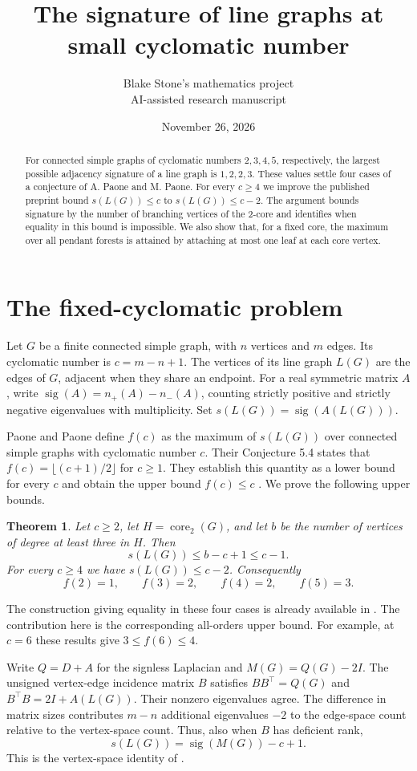 \documentclass[11pt]{article}
\title{The signature of line graphs at small cyclomatic number}
\author{Blake Stone's mathematics project\\\small AI-assisted research manuscript}
\date{November 26, 2026}
\newtheorem{theorem}{Theorem}[section]
\newcommand{\sg}{\operatorname{sig}}
\newcommand{\core}{\operatorname{core}_2}
\begin{document}
\maketitle
\begin{abstract}
For connected simple graphs of cyclomatic numbers $2,3,4,5$, respectively, the largest possible adjacency signature of a line graph is $1,2,2,3$. These values settle four cases of a conjecture of A. Paone and M. Paone. For every $c\ge4$ we improve the published preprint bound $s(L(G))\le c$ to $s(L(G))\le c-2$. The argument bounds signature by the number of branching vertices of the 2-core and identifies when equality in this bound is impossible. We also show that, for a fixed core, the maximum over all pendant forests is attained by attaching at most one leaf at each core vertex.
\end{abstract}

\section{The fixed-cyclomatic problem}
Let $G$ be a finite connected simple graph, with $n$ vertices and $m$ edges. Its cyclomatic number is $c=m-n+1$. The vertices of its line graph $L(G)$ are the edges of $G$, adjacent when they share an endpoint. For a real symmetric matrix $A$, write $\sg(A)=n_+(A)-n_-(A)$, counting strictly positive and strictly negative eigenvalues with multiplicity. Set $s(L(G))=\sg(A(L(G)))$.

Paone and Paone define $f(c)$ as the maximum of $s(L(G))$ over connected simple graphs with cyclomatic number $c$. Their Conjecture 5.4 states that $f(c)=\lfloor(c+1)/2\rfloor$ for $c\ge1$. They establish this quantity as a lower bound for every $c$ and obtain the upper bound $f(c)\le c$ \cite[Proposition 5.2 and Theorem 5.3]{pp}. We prove the following upper bounds.
\begin{theorem}\label{th:main}
Let $c\ge2$, let $H=\core(G)$, and let $b$ be the number of vertices of degree at least three in $H$. Then
\[
 s(L(G))\le b-c+1\le c-1.
\]
For every $c\ge4$ we have $s(L(G))\le c-2$. Consequently
\[
 f(2)=1,\qquad f(3)=2,\qquad f(4)=2,\qquad f(5)=3.
\]
\end{theorem}
The construction giving equality in these four cases is already available in \cite[Theorem 5.3]{pp}. The contribution here is the corresponding all-orders upper bound. For example, at $c=6$ these results give $3\le f(6)\le4$.

Write $Q=D+A$ for the signless Laplacian and $M(G)=Q(G)-2I$. The unsigned vertex-edge incidence matrix $B$ satisfies $BB^\top=Q(G)$ and $B^\top B=2I+A(L(G))$. Their nonzero eigenvalues agree. The difference in matrix sizes contributes $m-n$ additional eigenvalues $-2$ to the edge-space count relative to the vertex-space count. Thus, also when $B$ has deficient rank,
\begin{equation}\label{eq:sig}
 s(L(G))=\sg(M(G))-c+1.
\end{equation}
This is the vertex-space identity of \cite[Lemma 2.2]{pp}.
\end{document}

